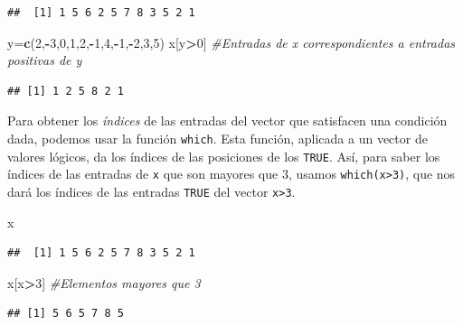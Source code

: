 \documentclass[]{book}
\newenvironment{Shaded}{\begin{snugshade}}{\end{snugshade}}
\newcommand{\CommentTok}[1]{\textcolor[rgb]{0.56,0.35,0.01}{\textit{#1}}}
\newcommand{\DecValTok}[1]{\textcolor[rgb]{0.00,0.00,0.81}{#1}}
\newcommand{\KeywordTok}[1]{\textcolor[rgb]{0.13,0.29,0.53}{\textbf{#1}}}
\newcommand{\NormalTok}[1]{#1}
\newcommand{\OperatorTok}[1]{\textcolor[rgb]{0.81,0.36,0.00}{\textbf{#1}}}
\theoremstyle{definition}
\theoremstyle{definition}
\theoremstyle{definition}
\theoremstyle{remark}
\begin{document}
\begin{verbatim}
##  [1] 1 5 6 2 5 7 8 3 5 2 1
\end{verbatim}

\begin{Shaded}
\begin{Highlighting}[]
\NormalTok{y=}\KeywordTok{c}\NormalTok{(}\DecValTok{2}\NormalTok{,}\OperatorTok{-}\DecValTok{3}\NormalTok{,}\DecValTok{0}\NormalTok{,}\DecValTok{1}\NormalTok{,}\DecValTok{2}\NormalTok{,}\OperatorTok{-}\DecValTok{1}\NormalTok{,}\DecValTok{4}\NormalTok{,}\OperatorTok{-}\DecValTok{1}\NormalTok{,}\OperatorTok{-}\DecValTok{2}\NormalTok{,}\DecValTok{3}\NormalTok{,}\DecValTok{5}\NormalTok{)}
\NormalTok{x[y}\OperatorTok{>}\DecValTok{0}\NormalTok{] }\CommentTok{#Entradas de x correspondientes a entradas positivas de y}
\end{Highlighting}
\end{Shaded}

\begin{verbatim}
## [1] 1 2 5 8 2 1
\end{verbatim}

Para obtener los \emph{índices} de las entradas del vector que satisfacen una condición dada, podemos usar la función \texttt{which}. Esta función, aplicada a un vector de valores lógicos, da los índices de las posiciones de los \texttt{TRUE}. Así, para saber los índices de las entradas de \texttt{x} que son mayores que 3, usamos \texttt{which(x\textgreater{}3)}, que nos dará los índices de las entradas \texttt{TRUE} del vector \texttt{x\textgreater{}3}.

\begin{Shaded}
\begin{Highlighting}[]
\NormalTok{x}
\end{Highlighting}
\end{Shaded}

\begin{verbatim}
##  [1] 1 5 6 2 5 7 8 3 5 2 1
\end{verbatim}

\begin{Shaded}
\begin{Highlighting}[]
\NormalTok{x[x}\OperatorTok{>}\DecValTok{3}\NormalTok{] }\CommentTok{#Elementos mayores que 3}
\end{Highlighting}
\end{Shaded}

\begin{verbatim}
## [1] 5 6 5 7 8 5
\end{verbatim}
\end{document}

